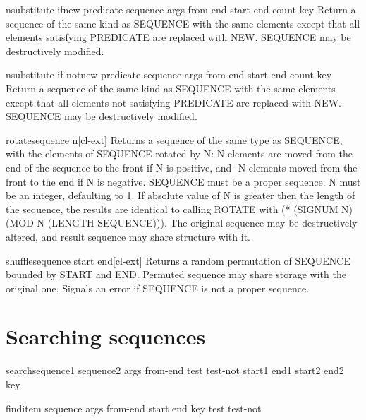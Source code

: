 \documentclass[10pt,english]{book}
\begin{document}
\begin{function}{nsubstitute-if}{new predicate sequence \rest args \key from-end start end count key}
  Return a sequence of the same kind as SEQUENCE with the same elements
  except that all elements satisfying PREDICATE are replaced with NEW.
  SEQUENCE may be destructively modified.
\end{function}

\begin{function}{nsubstitute-if-not}{new predicate sequence \rest args \key from-end start end count key}
  Return a sequence of the same kind as SEQUENCE with the same elements
  except that all elements not satisfying PREDICATE are replaced with NEW.
  SEQUENCE may be destructively modified.
\end{function}

\begin{function}{rotate}{sequence \op n}[cl-ext]
  Returns a sequence of the same type as SEQUENCE, with the elements
  of SEQUENCE rotated by N: N elements are moved from the end of the
  sequence to the front if N is positive, and -N elements moved from
  the front to the end if N is negative. SEQUENCE must be a proper
  sequence. N must be an integer, defaulting to 1. If absolute value
  of N is greater then the length of the sequence, the results are
  identical to calling ROTATE with (* (SIGNUM N) (MOD N (LENGTH
  SEQUENCE))). The original sequence may be destructively altered, and
  result sequence may share structure with it.
\end{function}

\begin{function}{shuffle}{sequence \key start end}[cl-ext]
  Returns a random permutation of SEQUENCE bounded by START and END.
  Permuted sequence may share storage with the original one. Signals
  an error if SEQUENCE is not a proper sequence.
\end{function}

\section{Searching sequences}
\label{sec:searching-sequences}

\begin{function}{search}{sequence1 sequence2 \rest args \key from-end test test-not start1 end1 start2
    end2 key}
  
\end{function}

\begin{function}{find}{item sequence \rest args \key from-end start end key test test-not}
  
\end{function}
\end{document}
